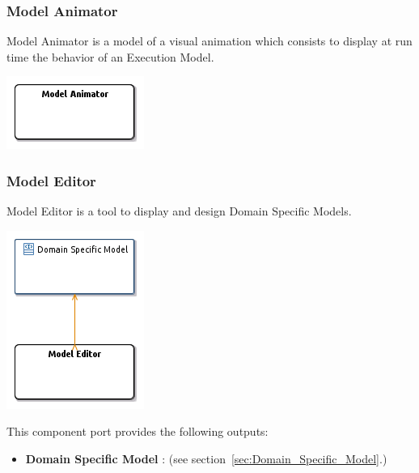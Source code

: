 \documentclass{gemoc} %
\begin{document}
\subsubsection{Model Animator}
\label{sec:Model_Animator}
Model Animator is a model of a visual animation which consists to display at run time the behavior of an Execution Model.
\begin{center}
\includegraphics*[trim=0.0cm 0.0cm 0cm 0.0cm, clip=true]{../images/generated/Generated_Model_Animator.png}
\end{center}




\subsubsection{Model Editor}
\label{sec:Model_Editor}
Model Editor is a tool to display and design Domain Specific Models.
\begin{center}
\includegraphics*[trim=0.0cm 0.0cm 0cm 0.0cm, clip=true]{../images/generated/Generated_Model_Editor.png}
\end{center}


This component port provides the following outputs:
\begin{itemize}
  \item \textbf{Domain Specific Model} :
(see section~\ref{sec:Domain_Specific_Model}.)
\end{itemize}
\end{document}
